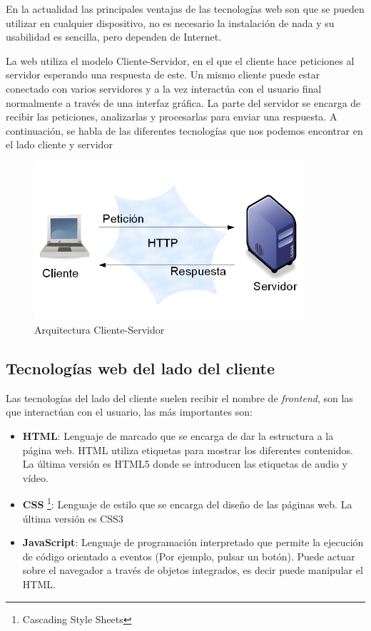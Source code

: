 En la actualidad las principales ventajas de las tecnologías web son que se pueden utilizar en cualquier dispositivo, no es necesario la instalación de nada y su usabilidad es sencilla, pero dependen de Internet.\cite{juan}

La web utiliza el modelo Cliente-Servidor, en el que el cliente hace peticiones al servidor esperando una respuesta de este. Un mismo cliente puede estar conectado con varios servidores y a la vez interactúa con el usuario final normalmente a través de una interfaz gráfica. La parte del servidor se encarga de recibir las peticiones, analizarlas y procesarlas para enviar una respuesta. A continuación, se habla de las diferentes tecnologías que nos podemos encontrar en el lado cliente y servidor

\begin{figure}[H]
    \centering
    \includegraphics[width=10cm, keepaspectratio]{img/arquitectura.png}
    \caption{Arquitectura Cliente-Servidor}
    \label{fig:arquitectura}
\end{figure}

\subsection{Tecnologías web del lado del cliente}
Las tecnologías del lado del cliente suelen recibir el nombre de \textit{frontend}, son las que interactúan con el usuario, las más importantes son:

\begin{itemize}
  \item \textbf{HTML}:  Lenguaje de marcado que se encarga de dar la estructura a la página web. HTML utiliza etiquetas para mostrar los diferentes contenidos. La última versión es HTML5 donde se introducen las etiquetas de audio y vídeo.
  \item \textbf{CSS} \footnote{Cascading Style Sheets}: Lenguaje de estilo que se encarga del diseño de las páginas web. La última versión es CSS3
  \item \textbf{JavaScript}: Lenguaje de programación interpretado que permite la ejecución de código orientado a eventos (Por ejemplo, pulsar un botón). Puede actuar sobre el navegador a través de objetos integrados, es decir puede manipular el HTML.
\end{itemize}
\newpage
